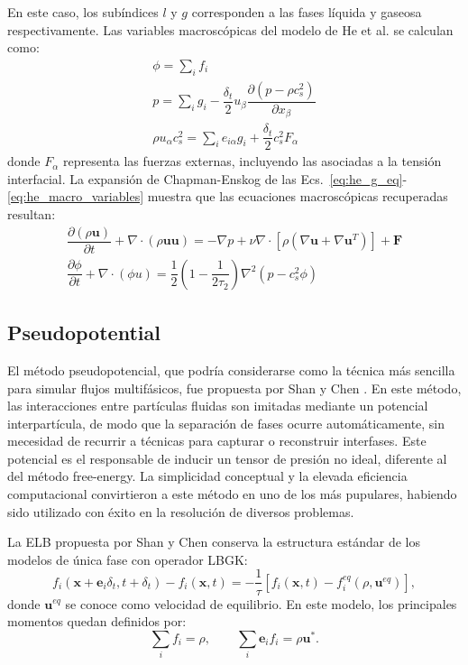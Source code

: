 En este caso, los sub\'indices $l$ y $g$ corresponden a las fases l\'iquida y gaseosa respectivamente. Las variables macrosc\'opicas del modelo de He et al. se calculan como:
\begin{equation}
	\begin{gathered}
		\phi = \sum_i f_i \\
		p = \sum_i g_i - \dfrac{\delta_t}{2} u_{\beta} \dfrac{\partial(p - \rho c_s^2)}{\partial x_{\beta}} \\
		\rho u_{\alpha}c_s^2 = \sum_i e_{i\alpha}g_i + \dfrac{\delta_t}{2}c_s^2 F_{\alpha}
	\end{gathered}
	\label{eq:he_macro_variables}
\end{equation}
donde $F_{\alpha}$ representa las fuerzas externas, incluyendo las asociadas a la tensi\'on interfacial. La expansi\'on de Chapman-Enskog de las Ecs.~\eqref{eq:he_g_eq}-\eqref{eq:he_macro_variables} muestra que las ecuaciones macrosc\'opicas recuperadas resultan:
\begin{equation}
	\begin{gathered}
		\dfrac{\partial (\rho \bm{u})}{\partial t} + \nabla \cdot (\rho \bm{uu})  = -\nabla p  + \nu \nabla \cdot \left[ \rho (\nabla\bm{u} + \nabla \bm{u}^T) \right] + \bm{F} \\
		\dfrac{\partial \phi}{\partial t} + \nabla \cdot (\phi \bm{}u) = \dfrac{1}{2} \left( 1 - \dfrac{1}{2\tau_2} \right) \nabla^2 (p - c_s^2 \phi)
	\end{gathered}
\end{equation}

\subsection*{Pseudopotential}
El m\'etodo pseudopotencial, que podr\'ia considerarse como la t\'ecnica m\'as sencilla para simular flujos multif\'asicos, fue propuesta por Shan y Chen \cite{shan_lattice_1993,shan_simulation_1994}. En este m\'etodo, las interacciones entre part\'iculas fluidas son imitadas mediante un potencial interpart\'icula, de modo que la separaci\'on de fases ocurre autom\'aticamente, sin mecesidad de recurrir a t\'ecnicas para capturar o reconstruir interfases. Este potencial es el responsable de inducir un tensor de presi\'on no ideal, diferente al del m\'etodo free-energy. La simplicidad conceptual y la elevada eficiencia computacional convirtieron a este m\'etodo en uno de los m\'as pupulares, habiendo sido utilizado con \'exito en la resoluci\'on de diversos problemas.
\par 
La ELB propuesta por Shan y Chen conserva la estructura est\'andar de los modelos de \'unica fase con operador LBGK:
\begin{equation}
	f_i(\bm{x}+\bm{e}_i\delta_t,t+\delta_t) - f_i(\bm{x},t)= -\dfrac{1}{\tau}\left[ f_i(\bm{x},t) - f_i^{eq}(\rho,\bm{u}^{eq}) \right],
\end{equation}
donde $\bm{u}^{eq}$ se conoce como velocidad de equilibrio. En este modelo, los principales momentos quedan definidos por:
\begin{equation}
	\sum_i f_i = \rho, \qquad	\sum_i \bm{e}_if_i = \rho \bm{u}^* .
\end{equation}


